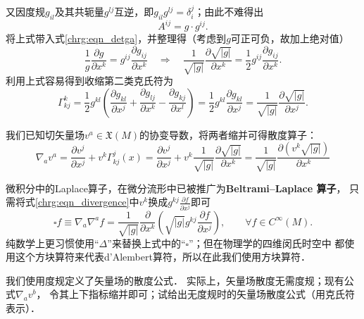 又因度规$g_{il}$及其共轭量$g^{lj}$互逆，即$g_{il}g^{lj}=\delta_i^j$；由此不难得出
\begin{equation}
    A^{ij}=g\cdot g^{ij} .
\end{equation}
将上式带入式\eqref{chrg:eqn_detga}，并整理得（考虑到$g$可正可负，故加上绝对值）
\begin{equation}\label{chrg:eqn_detgijij}
    \frac{1}{g}\frac{\partial g}{\partial x^k}= g^{ij} \frac{\partial g_{ij}}{\partial x^k}
    \quad \Rightarrow \quad
    \frac{1}{\sqrt{|g|}}\frac{\partial \sqrt{|g|}}{\partial x^k}=
     \frac{1}{2}g^{ij} \frac{\partial g_{ij}}{\partial x^k} .
\end{equation}
利用上式容易得到{\heiti 收缩第二类克氏符}为
\begin{equation}\label{chrg:eqn_Gamma-KKJ}
    \Gamma^k_{kj} = \frac{1}{2}{g^{kl}}\left( \frac{\partial g_{kl}}{\partial x^j}
        + \frac{\partial g_{lj}}{\partial x^k}  - \frac{\partial g_{kj}} {\partial x^l} \right)
    = \frac{1}{2}{g^{kl}}\frac{\partial g_{kl}}{\partial x^j}
    =\frac{1}{\sqrt{|g|}}\frac{\partial \sqrt{|g|}}{\partial x^j} .
\end{equation}



我们已知切矢量场$v^a\in \mathfrak{X}(M)$的协变导数，将两者缩并可得{\heiti 散度算子}：
\begin{equation}\label{chrg:eqn_divergence}
    \nabla_a v^a = \frac{\partial v^j}{\partial x^j} +v^k \Gamma_{kj}^{j}(x)
    = \frac{\partial v^j}{\partial x^j} +v^k \frac{1}{\sqrt{|g|}}\frac{\partial \sqrt{|g|}}{\partial x^k}
    =\frac{1}{\sqrt{|g|}}\frac{ \partial \left(v^k\sqrt{|g|}\right)}{\partial x^k} 
\end{equation}

微积分中的Laplace算子，在微分流形中已被推广为{\bfseries Beltrami--Laplace 算子}，
只需将式\eqref{chrg:eqn_divergence}中$v^k$换成$g^{kj} \frac{ \partial f}{\partial x^j}$即可
\begin{equation}\label{chrg:eqn_Beltrami-Laplace}
    \square f \equiv \nabla_a \nabla^a f = \frac{1}{\sqrt{|g|}}\frac{ \partial }{\partial x^k}
    \left( \sqrt{|g|}g^{kj} \frac{ \partial f}{\partial x^j}  \right) ,
    \qquad \forall f \in C^\infty(M) .
\end{equation}
纯数学上更习惯使用“$\Delta$”来替换上式中的“$\square$”；但在物理学的四维闵氏时空中
都使用这个方块算符来代表d'Alembert算符，所以在此我们使用方块算符．



\begin{exercise}
	我们使用度规定义了矢量场的散度公式．
	实际上，矢量场散度无需度规；现有公式$\nabla_a v^b$，
	令其上下指标缩并即可；试给出无度规时的矢量场散度公式（用克氏符表示）．
\end{exercise}

